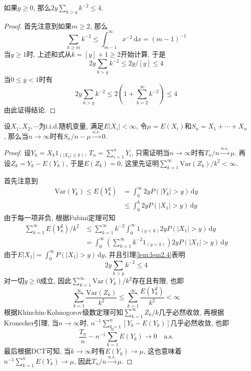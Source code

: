 \documentclass[cn, 12pt, math=mtpro2, bibstyle=apa, blue, twocol]{elegantbook}
\begin{document}
\begin{lemma}\label{lem:lem2.4}
如果$y\ge0$, 那么$2y\sum_{k>y}k^{-2}\leq 4$.
\end{lemma}
\begin{proof}
  首先注意到如果$m\ge2$, 那么
  $$\sum_{k\geq m}k^{-2}\leq \int_{m-1}^{\infty}x^{-2}\,\text{d}x=(m-1)^{-1}$$
  当$y\ge1$时, 上述和式从$k=[y]+1\geq2$开始计算, 于是
  $$2y\sum_{k>y}k^{-2}\leq 2y/[y]\leq 4$$
  当$0\leq y<1$时有
  $$2y\sum_{k>y}k^{-2}\leq 2\left(1+\sum_{k=2}^{\infty}k^{-2}\right)\leq 4$$
  由此证得结论.
\end{proof}
\begin{theorem}[Kolmogorov强大数定律]
  设$X_1,X_2,\cdots$为i.i.d.随机变量, 满足$E|X_i|<\infty$, 令$\mu=E(X_i)$和$S_n=X_1+\cdots+X_n$, 那么当$n\to\infty$时有$S_n/n-\mu\xrightarrow{a.s.}0$.
\end{theorem}
\begin{proof}
  设$Y_k=X_k1_{(|X_k|\leq k)}$, $T_n=\sum_{i=1}^{n}Y_i$, 只需证明当$n\to\infty$时有$T_n/n\xrightarrow{a.s.}\mu$. 再设$Z_k=Y_k-E(Y_k)$, 于是$E(Z_k)=0$, 这里先证明$\sum_{k=1}^{\infty}\text{Var}(Z_k)/k^2<\infty$.

  首先注意到
  \begin{align*}\text{Var}(Y_k)\leq E(Y^2_k)&=\int_{0}^{\infty}2yP(|Y_k|>y)\,\text{d}y \\
  &\leq\int_{0}^{k}2yP(|X_1|>y)\,\text{d}y\end{align*}
  由于每一项非负, 根据Fubini定理可知
  \begin{align*}
  \sum_{k=1}^{\infty}E(Y_k^2)/k^2&\leq \sum_{k=1}^{\infty}k^{-2}\int_{0}^{\infty}1_{(y<k)}2yP(|X_1|>y)\,\text{d}y \\
  &=\int_{0}^{\infty}\left(\sum_{k=1}^{\infty}k^{-2}1_{(y<k)}\right)2yP(|X_1|>y)\,\text{d}y
  \end{align*}
  由于$E|X_1|=\int_{0}^{\infty}P(|X_1|>y)\,\text{d}y$, 并且引理\ref{lem:lem2.4}表明
  $$2y\sum_{k>y}k^{-2}\leq 4$$
  对一切$y\ge0$成立, 因此$\sum_{k=1}^{\infty}\text{Var}(Y_k)/k^2$存在且有限, 也即
  $$\sum_{k=1}^{\infty}\frac{\text{Var}(Z_k)}{k^2}\leq\sum_{k=1}^{\infty}\frac{E(Y_k^2)}{k^2}<\infty$$
  根据Khinchin-Kolmogorov级数定理可知$\sum_{k=1}^{\infty}Z_k/k$几乎必然收敛, 再根据Kronecker引理, 当$n\to\infty$时, $n^{-1}\sum_{k=1}^{n}[Y_k-E(Y_k)]$几乎必然收敛, 也即
  $$\frac{T_n}{n}-n^{-1}\sum_{k=1}^{n}E(Y_k)\to0\quad \text{a.s.}$$
  最后根据DCT可知, 当$k\to\infty$时有$E(Y_k)\to \mu$, 这也意味着$n^{-1}\sum_{k=1}^{n}E(Y_k)\to\mu$, 因此$T_n/n\xrightarrow{a.s.}\mu$.

\end{proof}
\end{document}
